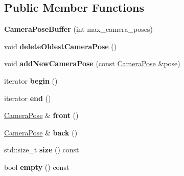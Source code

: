 \subsection*{Public Member Functions}
\begin{DoxyCompactItemize}
\item 
\hypertarget{class_camera_pose_buffer_a05b70112084cc230d9c1cac7d886e4d1}{{\bfseries Camera\-Pose\-Buffer} (int max\-\_\-camera\-\_\-poses)}\label{class_camera_pose_buffer_a05b70112084cc230d9c1cac7d886e4d1}

\item 
\hypertarget{class_camera_pose_buffer_a2b49cd0b92c21d0d0c6689c9a1c0fd0f}{void {\bfseries delete\-Oldest\-Camera\-Pose} ()}\label{class_camera_pose_buffer_a2b49cd0b92c21d0d0c6689c9a1c0fd0f}

\item 
\hypertarget{class_camera_pose_buffer_ac159b74f95674855e0161b69249d1e26}{void {\bfseries add\-New\-Camera\-Pose} (const \hyperlink{class_camera_pose}{Camera\-Pose} \&pose)}\label{class_camera_pose_buffer_ac159b74f95674855e0161b69249d1e26}

\item 
\hypertarget{class_camera_pose_buffer_a12612ec4993d931250cfa39d545b0699}{iterator {\bfseries begin} ()}\label{class_camera_pose_buffer_a12612ec4993d931250cfa39d545b0699}

\item 
\hypertarget{class_camera_pose_buffer_a5d8e1318f19521df04bccfe7c01ede23}{iterator {\bfseries end} ()}\label{class_camera_pose_buffer_a5d8e1318f19521df04bccfe7c01ede23}

\item 
\hypertarget{class_camera_pose_buffer_aa7ed926651db6f07f298064862af2791}{\hyperlink{class_camera_pose}{Camera\-Pose} \& {\bfseries front} ()}\label{class_camera_pose_buffer_aa7ed926651db6f07f298064862af2791}

\item 
\hypertarget{class_camera_pose_buffer_a56b8f43d2238bcba3ee9ab0bf232db5e}{\hyperlink{class_camera_pose}{Camera\-Pose} \& {\bfseries back} ()}\label{class_camera_pose_buffer_a56b8f43d2238bcba3ee9ab0bf232db5e}

\item 
\hypertarget{class_camera_pose_buffer_a2692a65ab8a1e38d2e8c607ff46c479d}{std\-::size\-\_\-t {\bfseries size} () const }\label{class_camera_pose_buffer_a2692a65ab8a1e38d2e8c607ff46c479d}

\item 
\hypertarget{class_camera_pose_buffer_a7b9fc93ead67dae155cb1e3cb3c39ddb}{bool {\bfseries empty} () const }\label{class_camera_pose_buffer_a7b9fc93ead67dae155cb1e3cb3c39ddb}

\end{DoxyCompactItemize}



